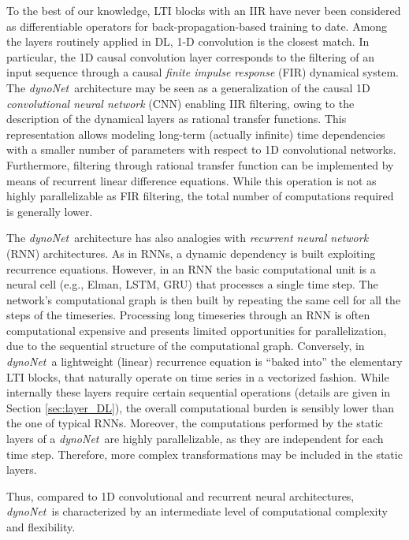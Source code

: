 \documentclass{article}
\newcommand{\Name}{\emph{dynoNet}}
\begin{document}
To the best of our knowledge, LTI blocks with an IIR have never been considered as differentiable operators for back-propagation-based training to date.
Among the layers routinely applied in DL, 1-D convolution \cite{wang2017time} is the closest match. In particular, the 1D causal convolution layer\cite{bai2018empirical,andersson:2019deep} corresponds to the filtering of an input sequence through a causal \emph{finite impulse response} (FIR) dynamical system.  
The \Name\ architecture may be seen as a generalization of the causal 1D \emph{convolutional neural network} (CNN) enabling IIR filtering, owing to the description of the dynamical layers as rational transfer functions. 
This representation allows modeling long-term (actually infinite) time dependencies with a smaller number of parameters with respect to 1D convolutional networks. 
Furthermore, filtering through rational transfer function can be implemented by means of recurrent linear difference equations. While this operation is not as highly parallelizable as FIR filtering, the total number of computations required is generally lower.


The \Name \  architecture has also analogies with \emph{recurrent neural network} (RNN) \cite{greff2016lstm} architectures. As in RNNs, a dynamic dependency is built exploiting recurrence equations. However, in  an RNN the basic computational unit is a neural cell (e.g., Elman, LSTM, GRU) that processes a single time step. The network's computational graph is then built by repeating the same cell for all the steps of the  timeseries. Processing long timeseries through an RNN is often computational expensive and presents limited opportunities for parallelization, due to the sequential structure of the computational graph.
Conversely, in \Name  \ a lightweight (linear) recurrence equation is ``baked into'' the elementary LTI blocks, that naturally operate on time series in a vectorized fashion.
While internally these layers require certain sequential operations (details are given in Section \ref{sec:layer_DL}), the overall computational burden is sensibly lower than the one of typical RNNs.
Moreover, the computations performed by the static layers of a \Name\ are highly parallelizable, as they are independent for each time step. Therefore, more complex transformations may be included in the static layers. 

Thus, compared to 1D convolutional and recurrent neural architectures, \Name \ is characterized by an intermediate level of computational complexity and flexibility.
\end{document}
